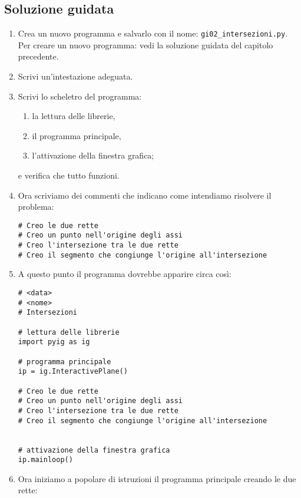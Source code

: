 \subsection{Soluzione guidata}

\begin{enumerate} [noitemsep]

\item Crea un nuovo programma e salvarlo con il nome: 
\texttt{gi02\_intersezioni.py}.
Per creare un nuovo programma: vedi la soluzione guidata del capitolo
precedente.

\item Scrivi un'intestazione adeguata.

\item Scrivi lo scheletro del programma:

\begin{enumerate} [noitemsep]
\item la lettura delle librerie,
\item il programma principale,
\item l'attivazione della finestra grafica;
\end{enumerate}

e verifica che tutto funzioni.

\item Ora scriviamo dei commenti che indicano come intendiamo risolvere il
problema:

\begin{lstlisting}
# Creo le due rette
# Creo un punto nell'origine degli assi
# Creo l'intersezione tra le due rette
# Creo il segmento che congiunge l'origine all'intersezione
\end{lstlisting}

\item A questo punto il programma dovrebbe apparire circa così:

\begin{lstlisting}
# <data>
# <nome>
# Intersezioni

# lettura delle librerie
import pyig as ig

# programma principale
ip = ig.InteractivePlane()

# Creo le due rette
# Creo un punto nell'origine degli assi
# Creo l'intersezione tra le due rette
# Creo il segmento che congiunge l'origine all'intersezione


# attivazione della finestra grafica
ip.mainloop()
\end{lstlisting}

\item Ora iniziamo a popolare di istruzioni il programma principale creando le
due rette:


\end{enumerate}
